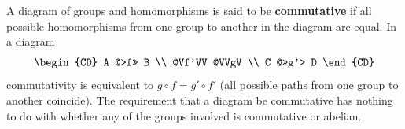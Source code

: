 A diagram of groups and homomorphisms is said to be \textbf{commutative} if all possible homomorphisms from one group to another in the diagram are equal. In a diagram
\[
\begin{CD}
A @>f>> B \\
@Vf'VV @VVgV \\
C @>>g'> D
\end{CD}
\]
commutativity is equivalent to $g \circ f = g' \circ f'$ (all possible paths from one group to another coincide). The requirement that a diagram be commutative has nothing to do with whether any of the groups involved is commutative or abelian.
